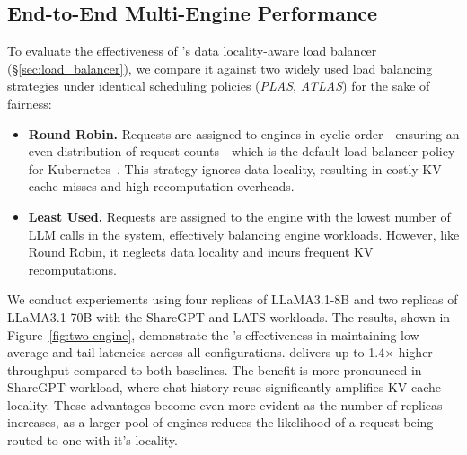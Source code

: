 
\subsection{End-to-End Multi-Engine Performance}   
To evaluate the effectiveness of \text{\name}'s data locality-aware load balancer (\S\ref{sec:load_balancer}), we compare it against two widely used load balancing strategies under identical scheduling policies (\textit{PLAS}, \textit{ATLAS}) for the sake of fairness:
\vspace{1mm}
\begin{itemize}[itemsep=0pt, parsep=0pt, topsep=0pt, partopsep=0pt, leftmargin=*] 
    \item \textbf{Round Robin.} Requests are assigned to engines in cyclic order—ensuring an even distribution of request counts—which is the default load-balancer policy for Kubernetes~\cite{kubernetes}. This strategy ignores data locality, resulting in costly KV cache misses and high recomputation overheads.
    \item \textbf{Least Used.} Requests are assigned to the engine with the lowest number of LLM calls in the system, effectively balancing engine workloads. However, like Round Robin, it neglects data locality and incurs frequent KV recomputations.
\end{itemize}

\vspace{1mm}

\noindent We conduct experiements using four replicas of LLaMA3.1-8B and two replicas of LLaMA3.1-70B with the ShareGPT and LATS workloads. The results, shown in Figure~\ref{fig:two-engine}, demonstrate the \text{\name}'s effectiveness in maintaining low average and tail latencies across all configurations. \text{\name} delivers up to 1.4× higher throughput compared to both baselines. The benefit is more pronounced in ShareGPT workload, where chat history reuse significantly amplifies KV-cache locality. These advantages become even more evident as the number of replicas increases, as a larger pool of engines reduces the likelihood of a request being routed to one with it's locality.


